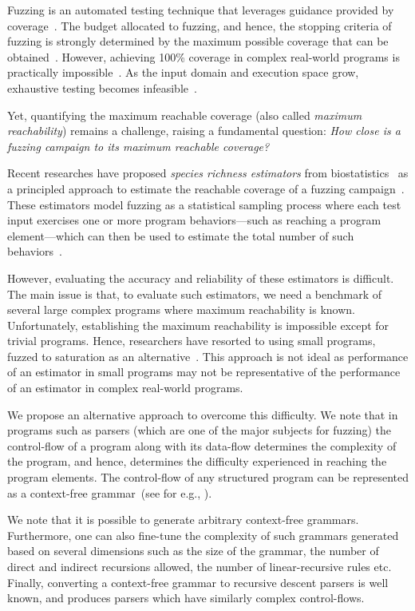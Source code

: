 \documentclass[conference,anonymous,review]{IEEEtran}
\begin{document}
Fuzzing is an automated testing technique that leverages guidance provided
by coverage~\cite{boehme2016coverage}.
The budget allocated to fuzzing, and hence, the stopping criteria
of fuzzing is strongly determined by the maximum possible coverage that can
be obtained~\cite{fell2017review}.
%
However, achieving 100\% coverage in complex real-world programs is practically impossible~\cite{horgan1994achieving}. 
As the input domain and execution space grow, exhaustive testing becomes infeasible~\cite{knight1996exhaustive}.

Yet, quantifying the maximum reachable coverage (also called \emph{maximum reachability}) remains a challenge, raising a fundamental question:
\emph{How close is a fuzzing campaign to its maximum reachable coverage?}

Recent researches have proposed \emph{species richness estimators} from
biostatistics~\cite{chao2016species} as a principled approach to estimate
the reachable coverage of a fuzzing campaign~\cite{boehme2018stads}.
These estimators model fuzzing as a statistical sampling process where
each test input exercises one or more program behaviors---such as reaching
a program element---which can then be used to estimate the total number of such behaviors~\cite{boehme2018stads}.

However, evaluating the accuracy and reliability
of these estimators is difficult. The main issue is that, to evaluate such
estimators, we need a benchmark of several large complex programs where
maximum reachability is known. Unfortunately, establishing the maximum
reachability is impossible except for trivial programs. Hence, researchers have resorted to using small programs, fuzzed to saturation as an alternative~\cite{liyanage2023reachable}.
This approach is not ideal as performance of an estimator in small
programs may not be representative of the performance of an estimator in complex
real-world programs.

We propose an alternative approach to overcome this difficulty. We note that
in programs such as parsers (which are one of the major subjects for fuzzing)
the control-flow of a program along with its data-flow determines the
complexity of the program, and hence, determines the difficulty
experienced in reaching the program elements. The control-flow of any
structured program can be represented as a context-free
grammar~(see for e.g., ).

We note that it is possible to generate arbitrary
context-free grammars. Furthermore, one can also fine-tune the complexity
of such grammars generated based on several dimensions such as the size
of the grammar, the number of direct and indirect recursions allowed, the
number of linear-recursive rules etc.
Finally, converting a context-free grammar to recursive descent
parsers is well known, and produces parsers which have similarly complex
control-flows.
\end{document}
